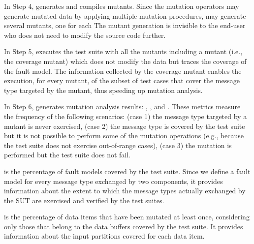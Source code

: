 {In Step 4, \DAMAT generates and compiles mutants. 
Since the \DAMAT mutation operators may generate mutated data by applying multiple mutation procedures, \DAMAT may generate several mutants, one for each 
The mutant generation is invisible to the end-user who does not need to modify the source code further.

In Step 5, \DAMAT executes the test suite with all the mutants including a mutant (i.e., the coverage mutant) which does not  modify the data but traces the coverage of the fault model. The information collected by the coverage mutant enables the execution, for every mutant, of the subset of test cases that cover the message type targeted by the mutant, thus speeding up mutation analysis.

In Step 6, \DAMAT generates mutation analysis results: , , and . 
These metrics measure the frequency of the following scenarios: (case 1) the message type targeted by a mutant is never exercised, (case 2) the message type is covered by the test suite but it is not possible to perform some of the mutation operations (e.g., because the test suite does not exercise out-of-range cases), (case 3) the mutation is performed but the test suite does not fail.

 is the percentage of fault models covered by the test suite. Since we define a fault model for every 
message type exchanged by two components,
it provides information about the extent to which the message types actually exchanged by the SUT are exercised and verified by the test suites. 

 is the percentage of data items that have been mutated at least once, considering only those that belong to the data buffers covered by the test suite. It provides information about the input partitions covered for each data item.

}
